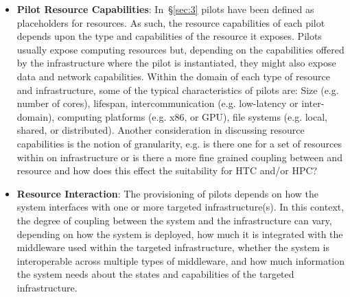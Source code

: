 \documentclass{sig-alternate}
\begin{document}
\begin{itemize}

\item \textbf{Pilot Resource Capabilities}: In~\S\ref{sec:3} pilots have been
  defined as placeholders for resources. As such, the resource capabilities of
  each pilot depends upon the type and capabilities of the resource it exposes.
  Pilots usually expose computing resources but, depending on the capabilities
  offered by the infrastructure where the pilot is instantiated, they might
  also expose data and network capabilities. Within the domain of each type of
  resource and infrastructure, some of the typical characteristics of pilots
  are: Size (e.g. number of cores), lifespan, intercommunication (e.g.
  low-latency or inter-domain), computing platforms (e.g. x86, or GPU),
  file systems (e.g. local, shared, or distributed).
  Another consideration in discussing \pilot resource capabilities is the
  notion of granularity, e.g. is there one \pilot for a set of resources within
  on infrastructure or is there a more fine grained coupling between \pilot and
  resource and how does this effect the suitability for HTC and/or HPC?


\item \textbf{Resource Interaction}: The provisioning of pilots
  depends on how the \pilot system interfaces with one or more
  targeted infrastructure(s). In this context, the degree of coupling
  between the \pilot system and the infrastructure can vary,
  depending on how the \pilot system is deployed, how much it is
  integrated with the middleware used within the targeted
  infrastructure, whether the \pilot system is interoperable across
  multiple types of middleware, and how much information the \pilot
  system needs about the states and capabilities of the targeted
  infrastructure.


\end{itemize}
\end{document}
